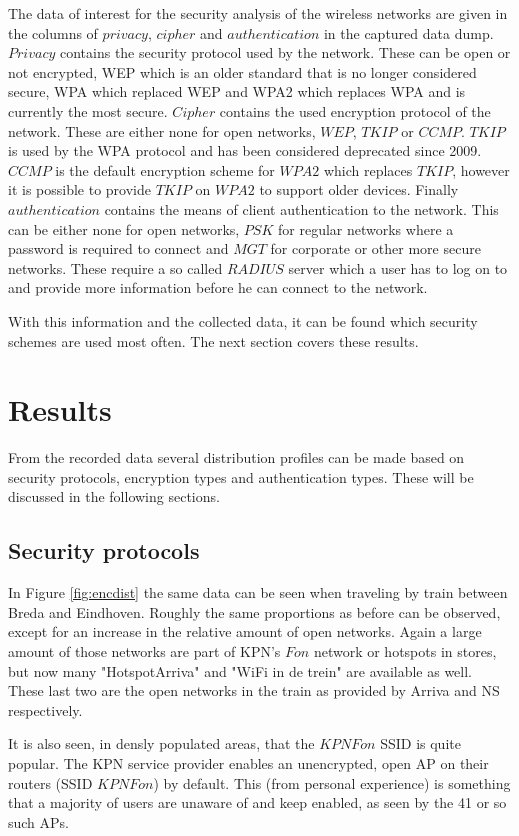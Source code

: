 \documentclass[letterpaper, 10 pt, conference]{ieeeconf}  %
\begin{document}
The data of interest for the security analysis of the wireless networks are given in the columns of $privacy$, $cipher$ and $authentication$ in the captured data dump. $Privacy$ contains the security protocol used by the network. These can be open or not encrypted, WEP which is an older standard that is no longer considered secure, WPA which replaced WEP and WPA2 which replaces WPA and is currently the most secure. $Cipher$ contains the used encryption protocol of the network. These are either none for open networks, $WEP$, $TKIP$ or $CCMP$. $TKIP$ is used by the WPA protocol and has been considered deprecated since 2009. $CCMP$ is the default encryption scheme for $WPA2$ which replaces $TKIP$, however it is possible to provide $TKIP$ on $WPA2$ to support older devices. Finally $authentication$ contains the means of client authentication to the network. This can be either none for open networks, $PSK$ for regular networks where a password is required to connect and $MGT$ for corporate or other more secure networks. These require a so called $RADIUS$ server which a user has to log on to and provide more information before he can connect to the network.

With this information and the collected data, it can be found which security schemes are used most often. The next section covers these results.
 
\section{Results}
From the recorded data several distribution profiles can be made based on security protocols, encryption types and authentication types. These will be discussed in the following sections.

\subsection{Security protocols}
In Figure \ref{fig:encdist} the same data can be seen when traveling by train between Breda and Eindhoven. Roughly the same proportions as before can be observed, except for an increase in the relative amount of open networks. Again a large amount of those networks are part of KPN's $Fon$ network or hotspots in stores, but now many "HotspotArriva" and "WiFi in de trein" are available as well. These last two are the open networks in the train as provided by Arriva and NS respectively.

It is also seen, in densly populated areas, that the $KPN Fon$ SSID is quite popular. The KPN service provider enables an unencrypted, open AP on their routers (SSID $KPN Fon$) by default. This (from personal experience) is something that a majority of users are unaware of and keep enabled, as seen by the 41 or so such APs.
\end{document}
